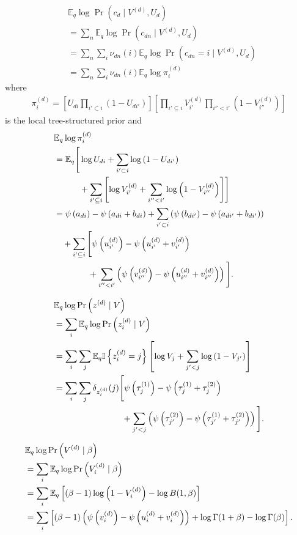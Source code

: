 \documentclass{article}
\newcommand{\I}{\ensuremath{\mathbb{I}}}
\newcommand{\digamma}[1]{\ensuremath{\psi\left(#1\right)}}
\newcommand{\Elogdirichlet}[2]{\ensuremath{\digamma{#1} - \digamma{#2}}}
\newcommand{\Elogbeta}[3]{\Elogdirichlet{\ifnum#3=1\relax#1\else#2\fi}{#1 + #2}}
\newcommand{\Eq}{\ensuremath{\mathbb{E}_q\xspace}}
\newcommand{\leftsibling}{\ensuremath{<}}
\newcommand{\ancestor}{\ensuremath{\subset}}
\newcommand{\ancestoreq}{\ensuremath{\subseteq}}
\begin{document}
\begin{align*}
    &\Eq \log \Pr\left(c_d \mid V^{(d)}, U_d\right) \\
    &= \sum_n \Eq \log \Pr\left(c_{dn} \mid V^{(d)}, U_d\right) \\
    &= \sum_n \sum_i \nu_{dn}(i) \Eq \log \Pr\left(c_{dn} = i \mid V^{(d)}, U_d\right) \\
    &= \sum_n \sum_i \nu_{dn}(i) \Eq \log \pi_i^{(d)}
\end{align*}
where
\begin{align*}
    \pi_i^{(d)} = \left[ U_{di} \prod_{i' \ancestor i}{\left(1 - U_{di'}\right)} \right] \left[ \prod_{i' \ancestoreq i} V_{i'}^{(d)} \prod_{i'' \leftsibling i'} \left(1 - V_{i''}^{(d)}\right) \right]
\end{align*}
is the local tree-structured prior and
\begin{align*}
    &\Eq \log \pi_i^{(d)} \\
    &= \Eq \Bigg[ \log U_{di} + \sum_{i' \ancestor i}{\log \left(1 - U_{di'}\right)} \\
    &\qquad\quad + \sum_{i' \ancestoreq i}{\left[ \log V_{i'}^{(d)} + \sum_{i'' \leftsibling i'} \log \left(1 - V_{i''}^{(d)}\right) \right]} \Bigg] \\
    &= \Elogbeta{a_{di}}{b_{di}}{1} + \sum_{i' \ancestor i}{\left(\Elogbeta{a_{di'}}{b_{di'}}{2}\right)} \\
    &\quad + \sum_{i' \ancestoreq i} \Bigg[ \Elogbeta{u_{i'}^{(d)}}{v_{i'}^{(d)}}{1} \\
    &\qquad\qquad + \sum_{i'' \leftsibling i'} \left(\Elogbeta{u_{i''}^{(d)}}{v_{i''}^{(d)}}{2}\right) \Bigg] .
\end{align*}

\begin{align*}
    &\Eq \log \Pr\left(z^{(d)} \mid V\right) \\
    &= \sum_i \Eq \log \Pr\left(z_i^{(d)} \mid V\right) \\
    &= \sum_i \sum_j \Eq \I\left\{z_i^{(d)} = j\right\} \left[ \log V_j + \sum_{j' < j} \log{(1 - V_{j'})} \right] \\
    &= \sum_i \sum_j \delta_{z_i^{(d)}}(j) \Bigg[ \Elogbeta{\tau_j^{(1)}}{\tau_j^{(2)}}{1} \\
    &\qquad\qquad\qquad\qquad + \sum_{j' < j}\left( \Elogbeta{\tau_{j'}^{(1)}}{\tau_{j'}^{(2)}}{2} \right)\Bigg] .
\end{align*}

\begin{align*}
    &\Eq \log \Pr\left(V^{(d)} \mid \beta\right) \\
    &= \sum_i \Eq \log \Pr\left(V_i^{(d)} \mid \beta\right) \\
    &= \sum_i \Eq \left[ (\beta - 1) \log \left(1 - V_i^{(d)}\right) - \log B(1, \beta) \right] \\
    &= \sum_i \left[ (\beta - 1) \left(\Elogbeta{u_i^{(d)}}{v_i^{(d)}}{2}\right) + \log \Gamma(1 + \beta) - \log \Gamma(\beta) \right] .
\end{align*}
\end{document}
